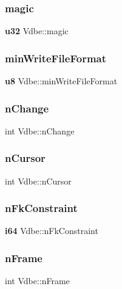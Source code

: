 \mbox{\label{struct_vdbe_a01c61f8cafa6ad3eaafcc85c6f53f8ef}} 
\subsubsection{magic}
{\footnotesize\ttfamily \textbf{ u32} Vdbe\+::magic}

\mbox{\label{struct_vdbe_a679ac87f7b835982cd7c1990fbc3605b}} 
\subsubsection{minWriteFileFormat}
{\footnotesize\ttfamily \textbf{ u8} Vdbe\+::min\+Write\+File\+Format}

\mbox{\label{struct_vdbe_a59d1ece56f21e260cdd0fef936242b28}} 
\subsubsection{nChange}
{\footnotesize\ttfamily int Vdbe\+::n\+Change}

\mbox{\label{struct_vdbe_aa12a6a1075311bd5d89bc69eaefc6351}} 
\subsubsection{nCursor}
{\footnotesize\ttfamily int Vdbe\+::n\+Cursor}

\mbox{\label{struct_vdbe_a7f46ff5e6b3dbf3632e941e27c82a485}} 
\subsubsection{nFkConstraint}
{\footnotesize\ttfamily \textbf{ i64} Vdbe\+::n\+Fk\+Constraint}

\mbox{\label{struct_vdbe_a27fbd083a0335ac2b332d37ea2b90bdc}} 
\subsubsection{nFrame}
{\footnotesize\ttfamily int Vdbe\+::n\+Frame}

\mbox{\label{struct_vdbe_a10a19309607617a75d3722219d3c7615}} 
